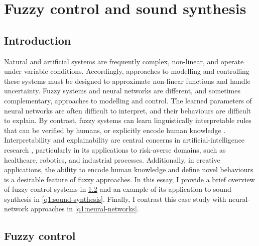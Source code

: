 \renewcommand{\thesection}{Q\arabic{section}}

\section{Fuzzy control and sound synthesis}

\renewcommand{\thesection}{\arabic{section}}
\renewcommand{\thesubsection}{\arabic{subsection}}

\subsection{Introduction}
\label{q1:introduction}

Natural and artificial systems are frequently complex, non-linear, and operate under
variable conditions.
Accordingly, approaches to modelling and controlling these systems must be designed to
approximate non-linear functions and handle uncertainty.
Fuzzy systems and neural networks are different, and sometimes complementary,
approaches to modelling and control.
The learned parameters of neural networks are often difficult to interpret, and their
behaviours are difficult to explain.
By contrast, fuzzy systems can learn linguistically interpretable rules that can be
verified by humans, or explicitly encode human knowledge \parencite[1593]{Babuska1996}.
Interpretability and explainability are central concerns in artificial-intelligence
research \parencite[e.g.][]{Gilpin2018}, particularly in its applications to
risk-averse domains, such as healthcare, robotics, and industrial processes.
Additionally, in creative applications, the ability to encode human knowledge and
define novel behaviours is a desirable feature of fuzzy approaches.
In this essay, I provide a brief overview of fuzzy control systems in
\cref{q1:fuzzy-control} and an example of its application to sound synthesis in
\cref{q1:sound-synthesis}.
Finally, I contrast this case study with neural-network approaches in
\cref{q1:neural-networks}.

\subsection{Fuzzy control}
\label{q1:fuzzy-control}

